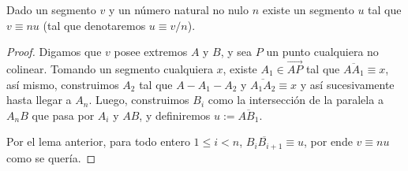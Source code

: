\documentclass[11pt,a4paper]{book}
\begin{document}
\begin{thm}
Dado un segmento $v$ y un número natural no nulo $n$ existe un segmento $u$ tal que $v\equiv nu$ (tal que denotaremos $u\equiv v/n$).
\end{thm}
\begin{proof}
Digamos que $v$ posee extremos $A$ y $B$, y sea $P$ un punto cualquiera no colinear. Tomando un segmento cualquiera $x$, existe $A_1\in\overrightarrow{AP}$ tal que $\overline{AA_1}\equiv x$, así mismo, construimos $A_2$ tal que $A-A_1-A_2$ y $\overline{A_1A_2}\equiv x$ y así sucesivamente hasta llegar a $A_n$. Luego, construimos $B_i$ como la intersección de la paralela a $A_nB$ que pasa por $A_i$ y $AB$, y definiremos $u:=\overline{AB_1}$. 
\begin{figure}
\centering
{}
\caption{}\label{fig:segment-division-euclid}
\end{figure}

	Por el lema anterior, para todo entero $1\leq i<n$, $\overline{B_iB_{i+1}}\equiv u$, por ende $v\equiv nu$ como se quería.
\end{proof}
\end{document}
